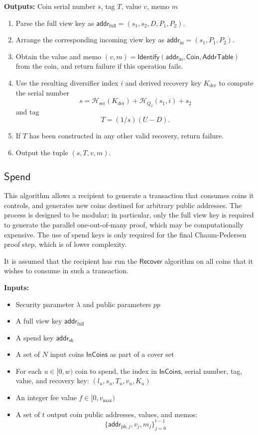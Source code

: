 \documentclass{llncs}
\newcommand{\hash}{\mathcal{H}}
\newcommand{\func}[1]{\mathsf{#1}}
\newcommand{\addr}{\func{addr}}
\begin{document}
\textbf{Outputs:} Coin serial number $s$, tag $T$, value $v$, memo $m$

\begin{enumerate}
\item Parse the full view key as $\addr_{\text{full}} = (s_1, s_2, D, P_1, P_2)$.
\item Arrange the corresponding incoming view key as $\addr_{\text{in}} = (s_1, P_1, P_2)$.
\item Obtain the value and memo $(v, m) = \func{Identify}(\addr_{\text{in}},\func{Coin},\func{AddrTable})$ from the coin, and return failure if this operation fails.
\item Use the resulting diversifier index $i$ and derived recovery key $K_{\text{der}}$ to compute the serial number $$s = \hash_{\text{ser}}(K_{\text{der}}) + \hash_{Q_2}(s_1,i) + s_2$$ and tag $$T = (1/s)(U - D).$$
\item If $T$ has been constructed in any other valid recovery, return failure.
\item Output the tuple $(s, T, v, m)$.
\end{enumerate}


\subsection{\texorpdfstring{$\func{Spend}$}{Spend}}

This algorithm allows a recipient to generate a transaction that consumes coins it controls, and generates new coins destined for arbitrary public addresses.
The process is designed to be modular; in particular, only the full view key is required to generate the parallel one-out-of-many proof, which may be computationally expensive.
The use of spend keys is only required for the final Chaum-Pedersen proof step, which is of lower complexity.

It is assumed that the recipient has run the $\func{Recover}$ algorithm on all coins that it wishes to consume in such a transaction.

\textbf{Inputs:}
\begin{itemize}
    \item Security parameter $\lambda$ and public parameters $pp$
    \item A full view key $\addr_{\text{full}}$
    \item A spend key $\addr_{\text{sk}}$
    \item A set of $N$ input coins $\func{InCoins}$ as part of a cover set
    \item For each $u \in [0,w)$ coin to spend, the index in $\func{InCoins}$, serial number, tag, value, and recovery key: $(l_u, s_u, T_u, v_u, K_u)$
    \item An integer fee value $f \in [0,v_{\text{max}})$
    \item A set of $t$ output coin public addresses, values, and memos: $$\{\addr_{\text{pk},j}, v_j, m_j\}_{j=0}^{t-1}$$
\end{itemize}
\end{document}
